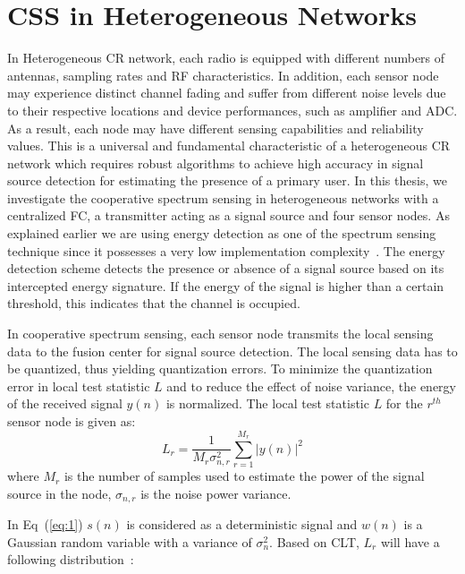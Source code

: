 \section{CSS in Heterogeneous Networks}
In Heterogeneous CR network, each radio is equipped with different numbers of antennas, sampling rates and RF characteristics. In addition, each sensor node may experience distinct channel fading and suffer from different noise levels due to their respective locations and device performances, such as amplifier and ADC.  As a result, each node may have different sensing capabilities and reliability values. This is a universal and fundamental characteristic of a heterogeneous CR network which requires robust algorithms to achieve high accuracy in signal source detection for estimating the presence of a primary user\cite{arhtn13}. In this thesis, we investigate the cooperative spectrum sensing in heterogeneous networks with a centralized FC, a transmitter acting as a signal source and four sensor nodes. As explained earlier we are using energy detection as one of the spectrum sensing technique since it possesses a very low implementation complexity~\cite{arhtn4}. The energy detection scheme detects the presence or absence of a signal source based on its intercepted energy signature. If the energy of the signal is higher than a certain threshold, this indicates that the channel is occupied. 


In cooperative spectrum sensing, each sensor node transmits the local sensing data to the fusion center for signal source detection. The local sensing data has to be quantized, thus yielding quantization errors. To minimize the quantization error in local test statistic $L$ and to reduce the effect of noise variance, the energy of the received signal $y(n)$ is normalized\cite{arhtn13}. The local test statistic $L$ for the $r^{th}$ sensor node is given as:
\begin{equation}
	\label{eq:5}
	L_r = \dfrac{1}{M_r\sigma_{n,r}^2}\sum_{r=1}^{M_r}|y(n)|^2
\end{equation}
where $M_r$ is the number of samples used to estimate the power of the signal source in the node,  $\sigma_{n,r}$ is the noise power variance.

In Eq~(\ref{eq:1}) $s(n)$ is considered as a deterministic signal and $w(n)$ is a Gaussian random variable with a variance of $\sigma_n^2$. Based on CLT, $L_r$ will have a following distribution~\cite{inphtn7}:

